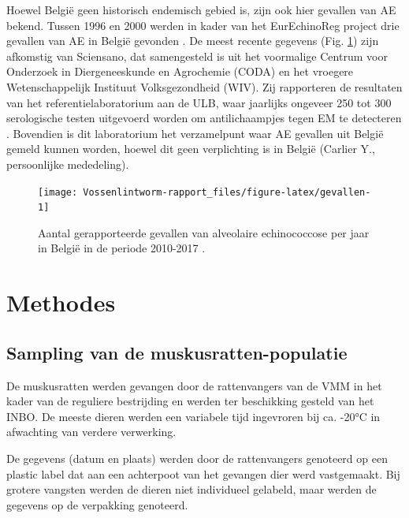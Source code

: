 \documentclass[twoside]{extreport}
\begin{document}
Hoewel België geen historisch endemisch gebied is, zijn ook hier
gevallen van AE bekend. Tussen 1996 en 2000 werden in kader van het
EurEchinoReg project drie gevallen van AE in België gevonden
\citep{kern2003european}. De meest recente gegevens (Fig.
\ref{fig:gevallen}) zijn afkomstig van Sciensano, dat samengesteld is
uit het voormalige Centrum voor Onderzoek in Diergeneeskunde en
Agrochemie (CODA) en het vroegere Wetenschappelijk Instituut
Volksgezondheid (WIV). Zij rapporteren de resultaten van het
referentielaboratorium aan de ULB, waar jaarlijks ongeveer 250 tot 300
serologische testen uitgevoerd worden om antilichaampjes tegen EM te
detecteren \citep{rebodello2017zoonosen}. Bovendien is dit laboratorium
het verzamelpunt waar AE gevallen uit België gemeld kunnen worden,
hoewel dit geen verplichting is in België (Carlier Y., persoonlijke
mededeling).





\begin{figure}

{\centering \texttt{[image: Vossenlintworm-rapport\_files/figure-latex/gevallen-1]} 

}

\caption{Aantal gerapporteerde gevallen van alveolaire
echinococcose per jaar in België in de periode 2010-2017
\citep{litzroth2017echinococcus}.}\label{fig:gevallen}
\end{figure}

\chapter{Methodes}\label{methodes}

\section{Sampling van de
muskusratten-populatie}\label{sampling-van-de-muskusratten-populatie}

De muskusratten werden gevangen door de rattenvangers van de VMM in het
kader van de reguliere bestrijding en werden ter beschikking gesteld van
het INBO. De meeste dieren werden een variabele tijd ingevroren bij ca.
-20°C in afwachting van verdere verwerking.

De gegevens (datum en plaats) werden door de rattenvangers genoteerd op
een plastic label dat aan een achterpoot van het gevangen dier werd
vastgemaakt. Bij grotere vangsten werden de dieren niet individueel
gelabeld, maar werden de gegevens op de verpakking genoteerd.
\end{document}
